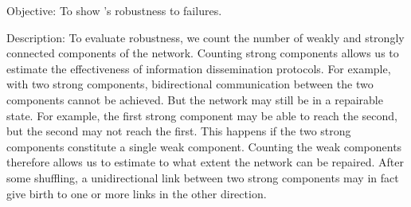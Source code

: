 \begin{asparadesc}
\item[Objective:] To show \SPRAY's robustness to failures.
\item[Description:] To evaluate robustness, we count the number of
  weakly and strongly connected components of the network. Counting
  strong components allows us to estimate the effectiveness of
  information dissemination protocols. For example, with two strong
  components, bidirectional communication between the two components
  cannot be achieved. But the network may still be in a repairable
  state.  For example, the first strong component may be able to reach
  the second, but the second may not reach the first. This happens if
  the two strong components constitute a single weak
  component. Counting the weak components therefore allows us to
  estimate to what extent the network can be repaired.  After some
  shuffling, a unidirectional link between two strong components may
  in fact give birth to one or more links in the other direction.


\end{asparadesc}
